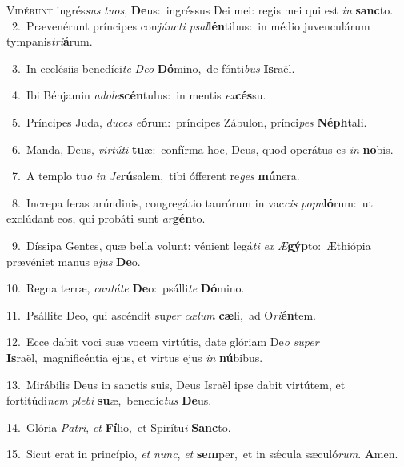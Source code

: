 \lettrine{\initial\textcolor{\initialcolor}{V}}{idérunt} ingrés\textit{sus} \textit{tu}\-\textit{os}, \textbf{De}\-us:~\star ingréssus Dei mei: regis mei qui est \textit{in} \textbf{sanc}\-to.\\
{\numbfont\textcolor{\numbcolor}{~2.}}~Prævenérunt príncipes con\-\textit{júnc}\-\textit{ti} \textit{psal}\-\textbf{lén}tibus:~\star in médio juvenculárum tympanis\-\textit{tri}\-\textbf{á}rum.\par
{\numbfont\textcolor{\numbcolor}{~3.}}~In ecclésiis benedíci\textit{te} \textit{De}\-\textit{o} \textbf{Dó}\-mino,~\star de fónti\textit{bus} \textbf{Is}\-raël.\par
{\numbfont\textcolor{\numbcolor}{~4.}}~Ibi Bénjamin \textit{ad}\-\textit{o}\textit{le}\textbf{scén}tulus:~\star in mentis \textit{ex}\-\textbf{cés}su.\par
{\numbfont\textcolor{\numbcolor}{~5.}}~Príncipes Juda, \textit{du}\-\textit{ces} \textit{e}\-\textbf{ó}rum:~\star príncipes Zábulon, prínci\textit{pes} \textbf{Néph}\-tali.\par
{\numbfont\textcolor{\numbcolor}{~6.}}~Manda, Deus, \textit{vir}\-\textit{tú}\textit{ti} \textbf{tu}\-æ:~\star confírma hoc, Deus, quod operátus es \textit{in} \textbf{no}\-bis.\par
{\numbfont\textcolor{\numbcolor}{~7.}}~A templo tu\textit{o} \textit{in} \textit{Je}\-\textbf{rú}salem,~\star tibi ófferent re\textit{ges} \textbf{mú}\-nera.\par
{\numbfont\textcolor{\numbcolor}{~8.}}~Increpa feras arúndinis, congregátio taurórum in vac\textit{cis} \textit{po}\-\textit{pu}\textbf{ló}rum:~\star ut exclúdant eos, qui probáti sunt \textit{ar}\-\textbf{gén}to.\par
{\numbfont\textcolor{\numbcolor}{~9.}}~Díssipa Gentes, quæ bella volunt: vénient legá\textit{ti} \textit{ex} \textit{Æ}\-\textbf{gýp}to:~\star Æthiópia prævéniet manus e\textit{jus} \textbf{De}\-o.\par
{\numbfont\textcolor{\numbcolor}{10.}}~Regna terræ, \textit{can}\-\textit{tá}\textit{te} \textbf{De}\-o:~\star psálli\textit{te} \textbf{Dó}\-mino.\par
{\numbfont\textcolor{\numbcolor}{11.}}~Psállite Deo, qui ascéndit su\textit{per} \textit{cæ}\-\textit{lum} \textbf{cæ}\-li,~\star ad O\-\textit{ri}\-\textbf{én}tem.\par
{\numbfont\textcolor{\numbcolor}{12.}}~Ecce dabit voci suæ vocem virtútis, date glóriam De\textit{o} \textit{su}\-\textit{per} \textbf{Is}\-raël,~\star magnificéntia ejus, et virtus ejus \textit{in} \textbf{nú}\-bibus.\par
{\numbfont\textcolor{\numbcolor}{13.}}~Mirábilis Deus in sanctis suis, Deus Israël ipse dabit virtútem, et fortitúdi\textit{nem} \textit{ple}\-\textit{bi} \textbf{su}\-æ,~\star benedíc\textit{tus} \textbf{De}\-us.\par
{\numbfont\textcolor{\numbcolor}{14.}}~Glória \textit{Pa}\-\textit{tri}, \textit{et} \textbf{Fí}\-lio,~\star et Spirítu\textit{i} \textbf{Sanc}\-to.\par
{\numbfont\textcolor{\numbcolor}{15.}}~Sicut erat in princípio, \textit{et} \textit{nunc}\-, \textit{et} \textbf{sem}\-per,~\star et in sǽcula sæculó\-\textit{rum}\-. \textbf{A}\-men.\par
